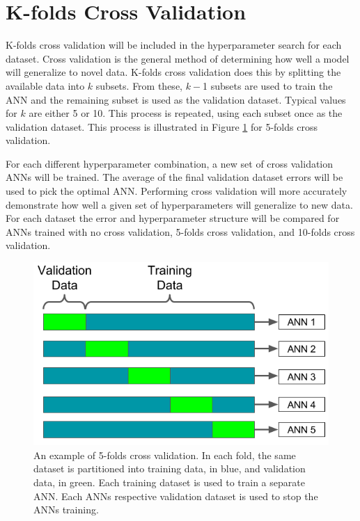 \documentclass[tocnosub,noragright,centerchapter,12pt,fullpage]{uiucecethesis09}
\begin{document}





\section{K-folds Cross Validation} \label{CrossValidation}

K-folds cross validation will be included in the hyperparameter search for each dataset. Cross validation is the general method of determining how well a model will generalize to novel data. K-folds cross validation does this by splitting the available data into $k$ subsets. From these, $k-$1 subsets are used to train the ANN and the remaining subset is used as the validation dataset. Typical values for $k$ are either 5 or 10. This process is repeated, using each subset once as the validation dataset. This process is illustrated in Figure \ref{fig:kfolds_example} for 5-folds cross validation. 

For each different hyperparameter combination, a new set of cross validation ANNs will be trained. The average of the final validation dataset errors will be used to pick the optimal ANN. Performing cross validation will more accurately demonstrate how well a given set of hyperparameters will generalize to new data. For each dataset the error and hyperparameter structure will be compared for ANNs trained with no cross validation, 5-folds cross validation, and 10-folds cross validation.



\begin{figure}[H]
\centering
\includegraphics[width=0.6\linewidth]{images/kfolds_example}
\caption{An example of 5-folds cross validation. In each fold, the same dataset is partitioned into training data, in blue, and validation data, in green. Each training dataset is used to train a separate ANN. Each ANNs respective validation dataset is used to stop the ANNs training.}
\label{fig:kfolds_example}
\end{figure}
\end{document}
